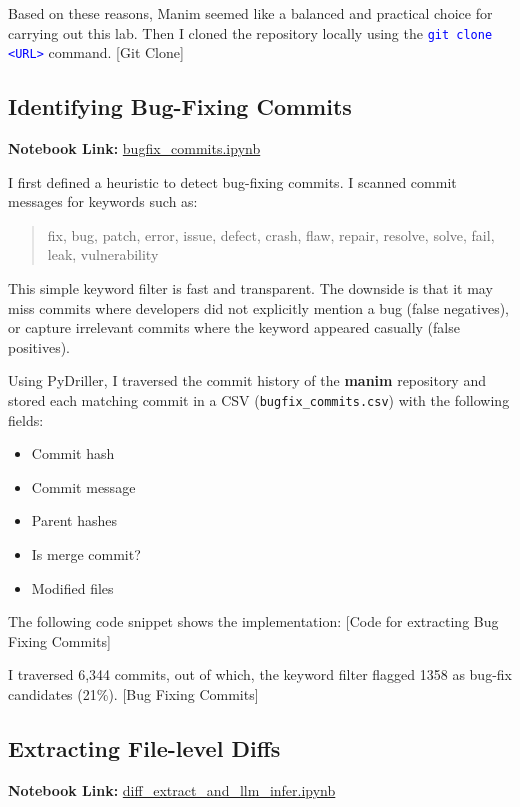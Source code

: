 \documentclass[10pt,a4paper]{report}
\newcommand{\command}[1]{\texttt{\textcolor{blue}{#1}}}
\begin{document}
Based on these reasons, Manim seemed like a balanced and practical choice for carrying out this lab. Then I cloned the repository locally using the \command{git clone <URL>} command.
[Git Clone]

\subsection{Identifying Bug-Fixing Commits}
\textbf{Notebook Link:} \href{https://github.com/ShardulJunagade/cs202-stt/blob/main/lab2/bugfix_commits.ipynb}{bugfix\_commits.ipynb}

I first defined a heuristic to detect bug-fixing commits. I scanned commit messages for keywords such as:
\begin{quote}
fix, bug, patch, error, issue, defect, crash, flaw, repair, resolve, solve, fail, leak, vulnerability
\end{quote}

This simple keyword filter is fast and transparent. The downside is that it may miss commits where developers did not explicitly mention a bug (false negatives), or capture irrelevant commits where the keyword appeared casually (false positives).

Using PyDriller, I traversed the commit history of the \textbf{manim} repository and stored each matching commit in a CSV (\texttt{bugfix\_commits.csv}) with the following fields:
\begin{itemize}[itemsep=0.05em, topsep=0pt]
    \item Commit hash
    \item Commit message
    \item Parent hashes
    \item Is merge commit?
    \item Modified files
\end{itemize}

The following code snippet shows the implementation:
[Code for extracting Bug Fixing Commits]

I traversed 6,344 commits, out of which, the keyword filter flagged 1358 as bug-fix candidates (21\%).
[Bug Fixing Commits]

\subsection{Extracting File-level Diffs}
\textbf{Notebook Link:} \href{https://github.com/ShardulJunagade/cs202-stt/blob/main/lab2/diff_extract_and_llm_infer.ipynb}{diff\_extract\_and\_llm\_infer.ipynb}
\end{document}
